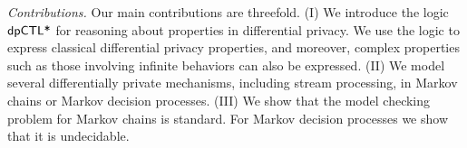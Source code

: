 \noindent
\emph{Contributions.} Our main contributions are threefold. (I)
We introduce the logic $\textsf{dpCTL*}$ for reasoning about properties in
differential privacy. We use the logic to express classical
differential privacy properties, and moreover, complex properties such as those
involving infinite behaviors can also be expressed. (II) We model several differentially private mechanisms, including stream processing, in Markov chains or Markov decision processes.
(III) We show that the model checking
problem for Markov chains is standard. For Markov decision processes we show that it is undecidable.
